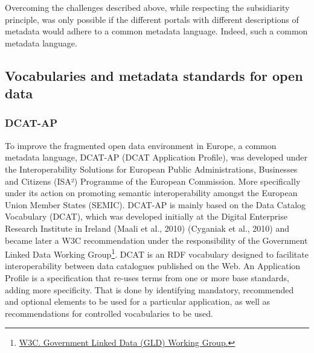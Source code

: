 \documentclass[<options>]{elsarticle}
\begin{document}
Overcoming the challenges described above, while respecting the subsidiarity principle, was only possible if the different portals with different descriptions of metadata would adhere to a common metadata language. Indeed, such a common metadata language.


\subsection{Vocabularies and metadata standards for open data}
\subsubsection{DCAT-AP}
To improve the fragmented open data environment in Europe, a common metadata language, DCAT-AP (DCAT Application Profile), was developed under the Interoperability Solutions for European Public Administrations, Businesses and Citizens (ISA²) Programme of the European Commission. More specifically under its action on promoting semantic interoperability amongst the European Union Member States (SEMIC). DCAT-AP is mainly based on the Data Catalog Vocabulary (DCAT), which was developed initially at the Digital Enterprise Research Institute in Ireland (Maali et al., 2010) (Cyganiak et al., 2010) and became later a W3C recommendation under the responsibility of the Government Linked Data Working Group\footnote{\href{http://www.w3.org/2011/gld/wiki/Main_Page}{W3C. Government Linked Data (GLD) Working Group.}}. DCAT is an RDF vocabulary designed to facilitate interoperability between data catalogues published on the Web. An Application Profile is a specification that re-uses terms from one or more base standards, adding more specificity. That is done by identifying mandatory, recommended and optional elements to be used for a particular application, as well as recommendations for controlled vocabularies to be used.
\end{document}
